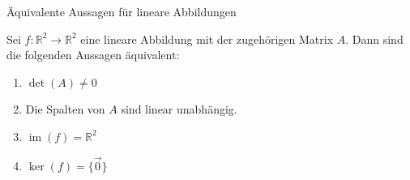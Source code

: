 \begin{satz}
    {Äquivalente Aussagen für lineare Abbildungen}{}

Sei \( f \colon \mathbb{R}^2 \to \mathbb{R}^2 \) eine lineare Abbildung mit der zugehörigen Matrix \( A \).  
Dann sind die folgenden Aussagen äquivalent:

\begin{enumerate}
  \item \( \det(A) \neq 0 \)
  \item Die Spalten von \( A \) sind linear unabhängig.
  \item \( \operatorname{im}(f) = \mathbb{R}^2 \)
  \item \( \ker(f) = \{ \vec{0} \} \)
\end{enumerate}

\end{satz}
